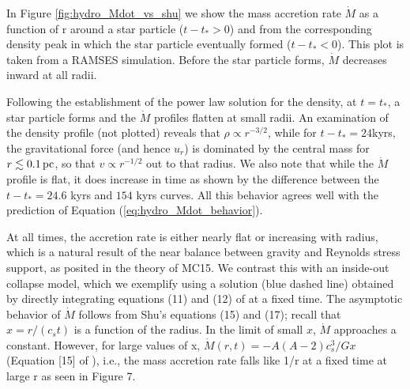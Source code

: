 \documentclass[../dissertation.tex]{subfiles}
\begin{document}
In Figure \ref{fig:hydro_Mdot_vs_shu} we show the mass accretion rate $\dot{M}$ as a function of r around a star particle ($t-t_* > 0$) and from the corresponding density peak in which the star particle eventually formed ($t-t_*<0$). This plot is taken from a RAMSES simulation. Before the star particle forms, $\dot{M}$ decreases inward at all radii. 

Following the establishment of the power law solution for the density, at $t=t_*$, a star particle forms and the $\dot{M}$ profiles flatten at small radii. An examination of the density profile (not plotted) reveals that $\rho\propto r^{-3/2}$, while for $t-t_*=24$kyrs, the gravitational force (and hence $u_r$) is dominated by the central mass for $r\lesssim0.1\,\rm pc$, so that $v\propto r^{-1/2}$ out to that radius. We also note that while the $\dot{M}$ profile is flat, it does increase in time as shown by the difference between the $t-t_* = 24.6$ kyrs and $154$ kyrs curves. All this behavior agrees well with the prediction of Equation (\ref{eq:hydro_Mdot_behavior}).

At all times, the accretion rate is either nearly flat or increasing with radius, which is a natural result of the near balance between gravity and Reynolds stress support, as posited in the theory of MC15. We contrast this with an inside-out collapse model, which we exemplify using a \citet{1977ApJ...214..488S} solution (blue dashed line) obtained by directly integrating equations (11) and (12) of \citet{1977ApJ...214..488S} at a fixed time. The asymptotic behavior of $\dot{M}$ follows from Shu's equations (15) and (17);
recall that $x = r/ (c_s  t)$ is a function of the radius. 
In the limit of small $x$, $\dot{M}$ approaches a constant.
However, for large values of x,  
$\dot M(r,t)=-A(A-2) c_s^3/Gx$ (Equation [15] of \citealt{1977ApJ...214..488S}), i.e., the mass accretion rate falls like 1/r at a fixed time at large r as seen in Figure 7. 
\end{document}
